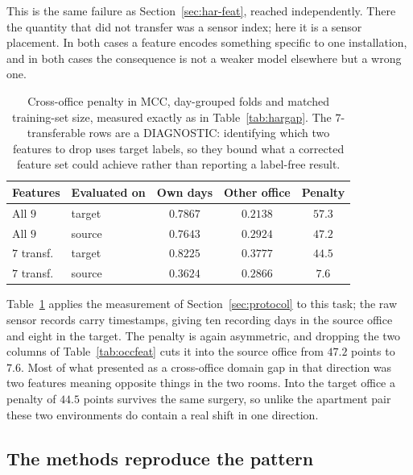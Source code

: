 \documentclass[a4paper,fleqn]{cas-dc}
\begin{document}
This is the same failure as Section~\ref{sec:har-feat}, reached independently. There the
quantity that did not transfer was a sensor index; here it is a sensor placement. In both
cases a feature encodes something specific to one installation, and in both cases the
consequence is not a weaker model elsewhere but a wrong one.

\begin{table}[t]
\centering
\caption{Cross-office penalty in MCC, day-grouped folds and matched training-set size,
measured exactly as in Table~\ref{tab:hargap}. The $7$-transferable rows are a DIAGNOSTIC:
identifying which two features to drop uses target labels, so they bound what a corrected
feature set could achieve rather than reporting a label-free result.}
\label{tab:occgap}
\footnotesize
\setlength{\tabcolsep}{4pt}
\begin{tabular}{@{}llccc@{}}
\toprule
Features & Evaluated on & Own days & Other office & Penalty \\
\midrule
All $9$ & target & $0.7867$ & $0.2138$ & $57.3$ \\
All $9$ & source & $0.7643$ & $0.2924$ & $47.2$ \\
\addlinespace[2pt]
$7$ transf. & target & $0.8225$ & $0.3777$ & $44.5$ \\
$7$ transf. & source & $0.3624$ & $0.2866$ & $\mathbf{7.6}$ \\
\bottomrule
\end{tabular}
\end{table}

Table~\ref{tab:occgap} applies the measurement of Section~\ref{sec:protocol} to this task;
the raw sensor records carry timestamps, giving ten recording days in the source office and
eight in the target. The penalty is again asymmetric, and dropping the two columns of
Table~\ref{tab:occfeat} cuts it into the source office from $47.2$ points to $7.6$. Most of what presented
as a cross-office domain gap in that direction was two features meaning opposite things in
the two rooms. Into the target office a penalty of $44.5$ points survives the same surgery,
so unlike the apartment pair these two environments do contain a real shift in one
direction.

\subsection{The methods reproduce the pattern}
\label{sec:occ-methods}
\end{document}

